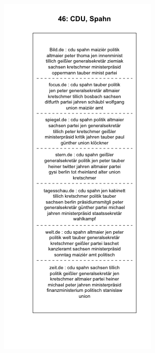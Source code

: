 \documentclass[12pt,a4paper,notitlepage]{article}
\begin{document}
\begin{figure}[H]
\begin{center}
\begin{subfigure}[normla]{0.49\textwidth}
		\end{subfigure}
		\begin{subfigure}[normla]{0.49\textwidth}
			\includegraphics[width=\textwidth]{../figs/plotquote46.png}
		\end{subfigure}
	\end{center}
\end{figure}
\end{document}
